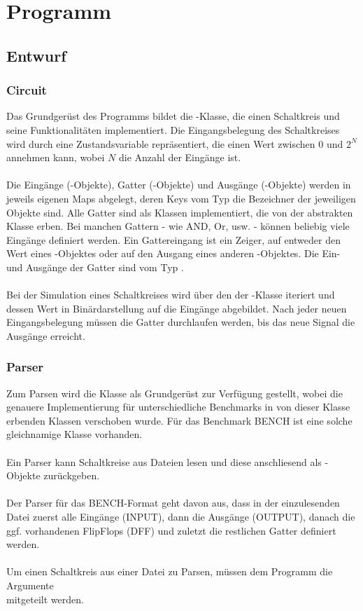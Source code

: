 \chapter{Programm}

\section{Entwurf}
\subsection{Circuit}
Das Grundgerüst des Programms bildet die -Klasse, die einen Schaltkreis und seine Funktionalitäten implementiert. Die Eingangsbelegung des Schaltkreises wird durch eine Zustandsvariable  repräsentiert, die einen Wert zwischen 0 und $2^N$ annehmen kann, wobei $N$ die Anzahl der Eingänge ist. 
\\\\
Die Eingänge (-Objekte), Gatter (-Objekte) und Ausgänge (-Objekte) werden in jeweils eigenen Maps abgelegt, deren Keys vom Typ  die Bezeichner der jeweiligen Objekte sind. Alle Gatter sind als Klassen implementiert, die von der abstrakten Klasse  erben. Bei manchen Gattern - wie AND, Or, usw. - können beliebig viele Eingänge definiert werden. Ein Gattereingang ist ein Zeiger, auf entweder den Wert eines -Objektes oder auf den Ausgang eines anderen -Objektes. Die Ein- und Ausgänge der Gatter sind vom Typ .
\\\\
Bei der Simulation eines Schaltkreises wird über den  der -Klasse iteriert und dessen Wert in Binärdarstellung auf die Eingänge abgebildet. Nach jeder neuen Eingangsbelegung müssen die Gatter durchlaufen werden, bis das neue Signal die Ausgänge erreicht.

\subsection{Parser}
Zum Parsen wird die Klasse  als Grundgerüst zur Verfügung gestellt, wobei die genauere Implementierung für unterschiedliche Benchmarks in von dieser Klasse erbenden Klassen verschoben wurde. Für das Benchmark BENCH ist eine solche gleichnamige Klasse vorhanden. 
\\\\
Ein Parser kann Schaltkreise aus Dateien lesen und diese anschliesend als -Objekte zurückgeben.
\\\\
Der Parser für das BENCH-Format geht davon aus, dass in der einzulesenden Datei zuerst alle Eingänge (INPUT), dann die Ausgänge (OUTPUT), danach die ggf. vorhandenen FlipFlops (DFF) und zuletzt die restlichen Gatter definiert werden. 
\\\\
Um einen Schaltkreis aus einer Datei zu Parsen, müssen dem Programm die Argumente \\ mitgeteilt werden.

